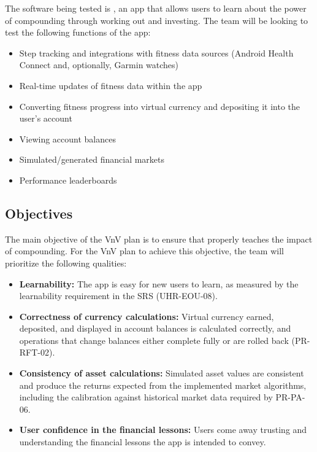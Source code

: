 \documentclass[12pt, titlepage]{article}
\begin{document}
The software being tested is \progname{}, an app that allows users to learn about the power of compounding through working out and investing.
The team will be looking to test the following functions of the app:
\begin{itemize}
  \item Step tracking and integrations with fitness data sources (Android Health Connect and, optionally, Garmin watches)
  \item Real-time updates of fitness data within the app
  \item Converting fitness progress into virtual currency and depositing it into the user's account
  \item Viewing account balances
  \item Simulated/generated financial markets
  \item Performance leaderboards
\end{itemize}

\subsection{Objectives}

The main objective of the VnV plan is to ensure that \progname{} properly teaches the impact of compounding.
For the VnV plan to achieve this objective, the team will prioritize the following qualities:
\begin{itemize}
  \item \textbf{Learnability:} The app is easy for new users to learn, as measured by the learnability requirement in the SRS (UHR-EOU-08).
  \item \textbf{Correctness of currency calculations:} Virtual currency earned, deposited, and displayed in account balances is calculated correctly, and operations that change balances either complete fully or are rolled back (PR-RFT-02).
  \item \textbf{Consistency of asset calculations:} Simulated asset values are consistent and produce the returns expected from the implemented market algorithms, including the calibration against historical market data required by PR-PA-06.
  \item \textbf{User confidence in the financial lessons:} Users come away trusting and understanding the financial lessons the app is intended to convey.
\end{itemize}
\end{document}

